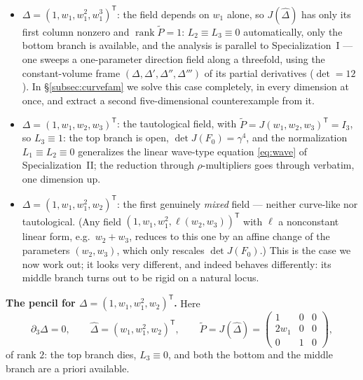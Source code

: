\documentclass[11pt]{article}
\theoremstyle{plain}
\theoremstyle{definition}
\theoremstyle{remark}
\begin{document}
\begin{itemize}
\item $\Delta=(1,w_1,w_1^2,w_1^3)^{\mathsf T}$: the field depends on $w_1$ alone, so
$J(\widehat\Delta)$ has only its first column nonzero and
$\operatorname{rank}\widetilde P=1$: $L_2\equiv L_3\equiv0$ automatically, only
the bottom branch is available, and the analysis is parallel to
Specialization~I --- one sweeps a one-parameter direction field along a
threefold, using the constant-volume frame $(\Delta,\Delta',\Delta'',\Delta''')$
of its partial derivatives ($\det=12$). In \S\ref{subsec:curvefam} we solve this case
completely, in every dimension at once, and extract a second five-dimensional
counterexample from it.
\item $\Delta=(1,w_1,w_2,w_3)^{\mathsf T}$: the tautological field, with
$\widetilde P=J(w_1,w_2,w_3)^{\mathsf T}=I_3$, so $L_3\equiv1$: the top branch
is open, $\det J(F_0)=\gamma^4$, and the normalization $L_1\equiv L_2\equiv0$
generalizes the linear wave-type equation \eqref{eq:wave} of
Specialization~II; the reduction through $\rho$-multipliers goes through
verbatim, one dimension up.
\item $\Delta=(1,w_1,w_1^2,w_2)^{\mathsf T}$: the first genuinely \emph{mixed} field ---
neither curve-like nor tautological. (Any field
$(1,w_1,w_1^2,\ell(w_2,w_3))^{\mathsf T}$ with $\ell$ a nonconstant linear
form, e.g.\ $w_2+w_3$, reduces to this one by an affine change of the
parameters $(w_2,w_3)$, which only rescales $\det J(F_0)$.) This is the case
we now work out; it looks very different, and indeed behaves differently: its
middle branch turns out to be rigid on a natural locus.
\end{itemize}

\medskip\noindent\textbf{The pencil for $\Delta=(1,w_1,w_1^2,w_2)^{\mathsf T}$.}
Here
\[
\partial_3\Delta=0,\qquad
\widehat\Delta=(w_1,w_1^2,w_2)^{\mathsf T},\qquad
\widetilde P=J(\widehat\Delta)=
\begin{pmatrix}1&0&0\\ 2w_1&0&0\\ 0&1&0\end{pmatrix},
\]
of rank $2$: the top branch dies, $L_3\equiv0$, and both the bottom and the
middle branch are a priori available.
\end{document}

